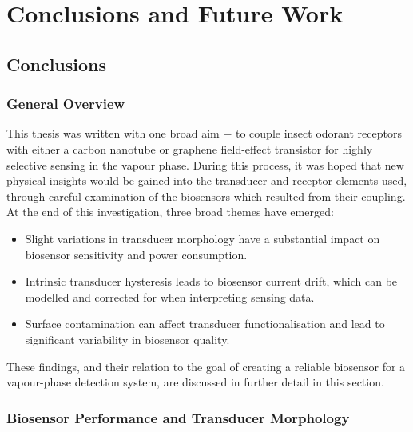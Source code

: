 \documentclass[
  a4paper,
]{scrbook}
\begin{document}

\hypertarget{conclusions-and-future-work}{%
\chapter{Conclusions and Future
Work}\label{conclusions-and-future-work}}

\hypertarget{sec-conclusions}{%
\section{Conclusions}\label{sec-conclusions}}

\hypertarget{general-overview-2}{%
\subsection{General Overview}\label{general-overview-2}}

This thesis was written with one broad aim \(-\) to couple insect
odorant receptors with either a carbon nanotube or graphene field-effect
transistor for highly selective sensing in the vapour phase. During this
process, it was hoped that new physical insights would be gained into
the transducer and receptor elements used, through careful examination
of the biosensors which resulted from their coupling. At the end of this
investigation, three broad themes have emerged:

\begin{itemize}
\item
  Slight variations in transducer morphology have a substantial impact
  on biosensor sensitivity and power consumption.
\item
  Intrinsic transducer hysteresis leads to biosensor current drift,
  which can be modelled and corrected for when interpreting sensing
  data.
\item
  Surface contamination can affect transducer functionalisation and lead
  to significant variability in biosensor quality.
\end{itemize}

These findings, and their relation to the goal of creating a reliable
biosensor for a vapour-phase detection system, are discussed in further
detail in this section.

\hypertarget{biosensor-performance-and-transducer-morphology}{%
\subsection{Biosensor Performance and Transducer
Morphology}\label{biosensor-performance-and-transducer-morphology}}
\end{document}
